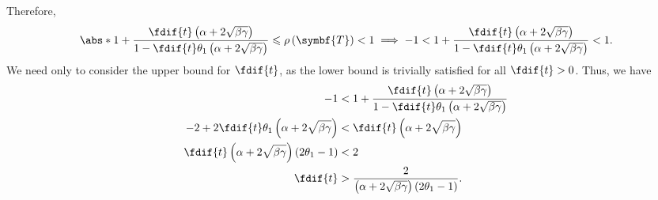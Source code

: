 \documentclass{article}
\begin{document}
Therefore,
\begin{equation*}
    \abs*{1 + \frac{\fdif{t} \left( \alpha + 2 \sqrt{\beta \gamma} \right)}{1 - \fdif{t} \theta_1 \left( \alpha + 2 \sqrt{\beta \gamma} \right)}} \leqslant \rho\left( \symbf{T} \right) < 1 \implies -1 < 1 + \frac{\fdif{t} \left( \alpha + 2 \sqrt{\beta \gamma} \right)}{1 - \fdif{t} \theta_1 \left( \alpha + 2 \sqrt{\beta \gamma} \right)} < 1.
\end{equation*}
We need only to consider the upper bound for \(\fdif{t}\), as the lower
bound is trivially satisfied for all \(\fdif{t} > 0\). Thus, we have
\begin{align*}
    -1                                                                                   & < 1 + \frac{\fdif{t} \left( \alpha + 2 \sqrt{\beta \gamma} \right)}{1 - \fdif{t} \theta_1 \left( \alpha + 2 \sqrt{\beta \gamma} \right)} \\
    -2 + 2 \fdif{t} \theta_1 \left( \alpha + 2 \sqrt{\beta \gamma} \right)               & < \fdif{t} \left( \alpha + 2 \sqrt{\beta \gamma} \right)                                                                                 \\
    \fdif{t} \left( \alpha + 2 \sqrt{\beta \gamma} \right) \left( 2 \theta_1 - 1 \right) & < 2                                                                                                                                      \\
    \fdif{t}                                                                             & > \frac{2}{\left( \alpha + 2 \sqrt{\beta \gamma} \right) \left( 2 \theta_1 - 1 \right)}.
\end{align*}
\end{document}
